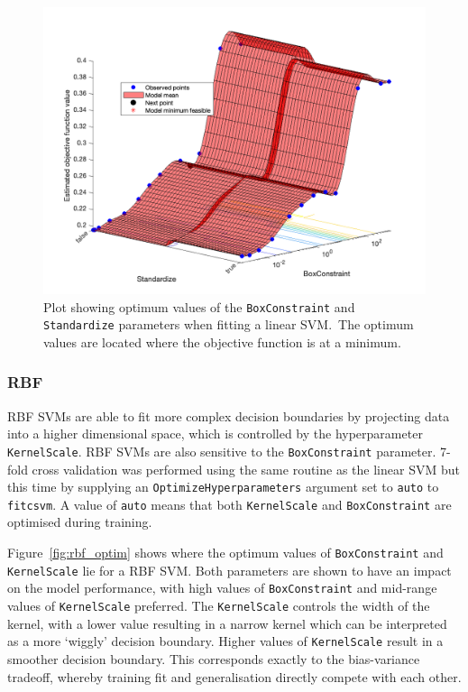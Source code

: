 \begin{figure}[ht]
  \centering
  \includegraphics[width=\textwidth]{figures/linear_optim.png}
  \caption{Plot showing optimum values of the \texttt{BoxConstraint} and
  \texttt{Standardize} parameters when fitting a linear SVM.\ The optimum values
are located where the objective function is at a
minimum.}\label{fig:linear_optim}
\end{figure}

\subsubsection{RBF}

RBF SVMs are able to fit more complex decision boundaries by projecting data
into a higher dimensional space, which is controlled by the hyperparameter
\texttt{KernelScale}. RBF SVMs are also sensitive to the \texttt{BoxConstraint}
parameter. 7-fold cross validation was performed using the same routine as the
linear SVM but this time by supplying an \texttt{OptimizeHyperparameters}
argument set to \texttt{auto} to \texttt{fitcsvm}. A value of \texttt{auto}
means that both \texttt{KernelScale} and \texttt{BoxConstraint} are optimised
during training.

Figure~\ref{fig:rbf_optim} shows where the optimum values of
\texttt{BoxConstraint} and \texttt{KernelScale} lie for a RBF SVM\@. Both
parameters are shown to have an impact on the model performance, with high
values of \texttt{BoxConstraint} and mid-range values of \texttt{KernelScale}
preferred. The \texttt{KernelScale} controls the width of the kernel, with a
lower value resulting in a narrow kernel which can be interpreted as a more
`wiggly' decision boundary. Higher values of \texttt{KernelScale} result in
a smoother decision boundary. This corresponds exactly to the bias-variance
tradeoff, whereby training fit and generalisation directly compete with each
other.

